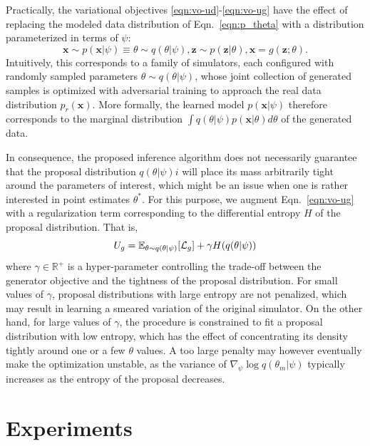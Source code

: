 \documentclass[twocolumn,superscriptaddress,aps]{revtex4-1}
\theoremstyle{plain}
\begin{document}
Practically, the variational objectives \ref{eqn:vo-ud}-\ref{eqn:vo-ug}
have the effect of replacing the modeled data distribution of Eqn.~\ref{eqn:p_theta} with
a distribution parameterized in terms of $\psi$:
\begin{equation}\label{eqn:p_psi}
    \mathbf{x} \sim p(\mathbf{x}|\psi) \equiv \theta \sim q(\theta|\psi), \mathbf{z} \sim p(\mathbf{z}|\theta), \mathbf{x} = g(\mathbf{z}; \theta).
\end{equation}
Intuitively, this corresponds to a family of simulators, each configured
with randomly sampled parameters $\theta \sim q(\theta|\psi)$, whose joint collection
of generated samples is optimized with adversarial training to approach the real data distribution $p_r(\mathbf{x})$.
More formally, the learned model $p(\mathbf{x}|\psi)$ therefore corresponds to the marginal distribution
$\int q(\theta|\psi) p(\mathbf{x}|\theta) d\theta$ of the generated data.

In consequence, the proposed inference algorithm does not necessarily guarantee that the
proposal distribution $q(\theta|\psi)i$ will place its mass arbitrarily tight
around the parameters of interest, which might be an issue when one is rather interested in point estimates $\theta^*$.
For this purpose, we augment Eqn.~\ref{eqn:vo-ug}
with a regularization term corresponding to the differential entropy $H$ of
the proposal distribution. That is,
\begin{equation}
    U_g = \mathbb{E}_{\theta \sim q(\theta|\psi)} [ {\cal L}_g ] + \gamma H(q(\theta|\psi))
\end{equation}
where $\gamma \in \mathbb{R}^+$ is a hyper-parameter controlling the trade-off
between the generator objective and the tightness of the proposal distribution.
For small values of $\gamma$,
proposal distributions with large entropy are not penalized, which may result
in learning a smeared variation of the original simulator. On the other hand,
for large values of $\gamma$, the procedure is constrained to fit a proposal
distribution with low entropy, which has the effect of concentrating its density
tightly around one or a few $\theta$ values. A too large penalty may however
eventually make the optimization unstable, as the variance of $\nabla_\psi \log q(\theta_m|\psi)$
typically increases as the entropy of the proposal decreases.




\section{Experiments}
\end{document}
